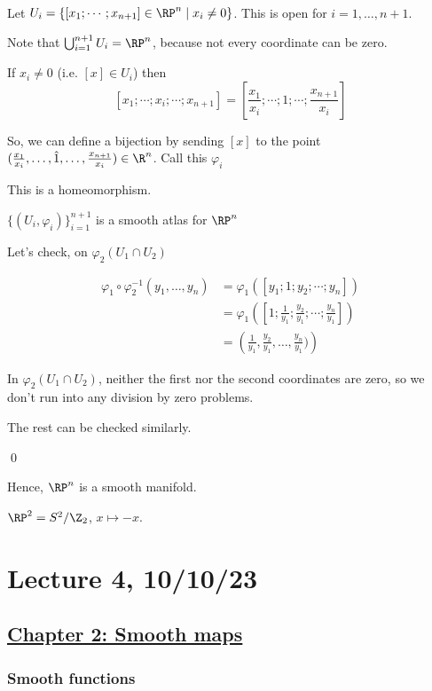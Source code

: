 \documentclass[x11names,reqno,14pt]{extarticle}
\renewcommand{\phi}{\varphi}
\begin{document}
\proof 
\,

Let $U_i = \{[x_1;\cdots;x_{n + 1}] \in \RP^n \mid x_i\neq0\}$. This is open for $i = 1, \dots, n + 1$. 

Note that $\bigcup_{i=1}^{n + 1}U_i = \RP^n$, because not every coordinate can be zero. 

If $x_i\neq0$ (i.e. $[x] \in U_i$) then 
\[
[x_1;\cdots;x_i;\cdots;x_{n + 1}] = [\frac{x_1}{x_i};\cdots;1;\cdots;\frac{x_{n + 1}}{x_i}]
\]

So, we can define a bijection by sending $[x]$ to the point $(\frac{x_1}{x_i}, \dots, \hat{1}, \dots, \frac{x_{n + 1}}{x_i})\in\R^n$. Call this $\phi_i$

This is a homeomorphism.

\claim

$\{(U_i, \phi_i)\}_{i = 1}^{n + 1}$ is a smooth atlas for $\RP^n$

\proof

Let's check, on $\phi_2(U_1 \cap U_2)$

\begin{align*}
\phi_1\circ\phi_2^{-1} (y_1, \dots, y_n) & = \phi_1\left([y_1;1;y_2;\cdots;y_n]\right) \\
& = \phi_1\left([1;\frac{1}{y_1};\frac{y_2}{y_1};\cdots;\frac{y_n}{y_1} ]\right) \\
& = \left(\frac{1}{y_1}, \frac{y_2}{y_1}, \dots, \frac{y_n}{y_1})\right)
\end{align*}

In $\phi_2(U_1\cap U_2)$, neither the first nor the second coordinates are zero, so we don't run into any division by zero problems. 

The rest can be checked similarly. 

\qed

Hence, $\RP^n$ is a smooth manifold. 

\exm

$\RP^2 = S^2/\Z_2$, $x\mapsto -x$. 

\section*{Lecture 4, 10/10/23}

\subsection*{\underline{Chapter 2: Smooth maps}}

\subsubsection*{Smooth functions}
\end{document}
